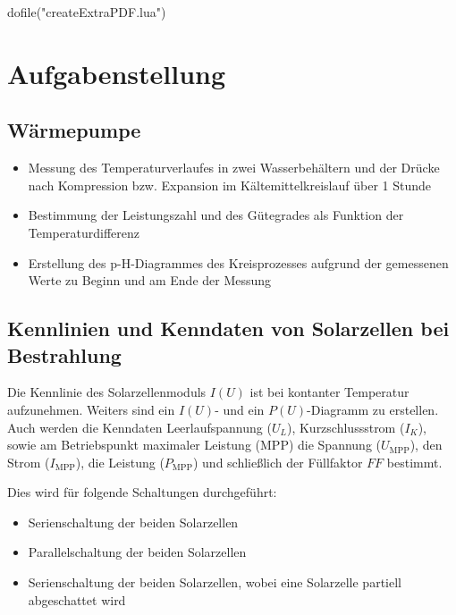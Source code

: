 \documentclass[12pt,english,ngerman]{scrartcl}
\begin{document}
\begin{luacode*}
	dofile("createExtraPDF.lua")
\end{luacode*}

% 
\tableofcontents

\newpage

\section{Aufgabenstellung\label{Auf}}

\subsection{Wärmepumpe}

\begin{itemize}
	\item Messung des Temperaturverlaufes in zwei Wasserbehältern und der Drücke nach
	      Kompression bzw. Expansion im Kältemittelkreislauf über 1 Stunde
	\item Bestimmung der Leistungszahl und des Gütegrades als Funktion der
	      Temperaturdifferenz
	\item Erstellung des p-H-Diagrammes des Kreisprozesses aufgrund der gemessenen Werte
	      zu Beginn und am Ende der Messung
\end{itemize}
\subsection{Kennlinien und Kenndaten von Solarzellen bei Bestrahlung}

Die Kennlinie des Solarzellenmoduls $I(U)$ ist bei kontanter Temperatur
aufzunehmen. Weiters sind ein $I(U)$- und ein $P(U)$-Diagramm zu erstellen.
Auch werden die Kenndaten Leerlaufspannung ($U_L$), Kurzschlussstrom ($I_K$),
sowie am Betriebspunkt maximaler Leistung (MPP) die Spannung ($U_\text{MPP}$),
den Strom ($I_\text{MPP}$), die Leistung ($P_\text{MPP}$) und schließlich der
Füllfaktor $FF$ bestimmt.

Dies wird für folgende Schaltungen durchgeführt:

\begin{itemize}
	\item Serienschaltung der beiden Solarzellen
	\item Parallelschaltung der beiden Solarzellen
	\item Serienschaltung der beiden Solarzellen, wobei eine Solarzelle partiell
	      abgeschattet wird
\end{itemize}
\end{document}
